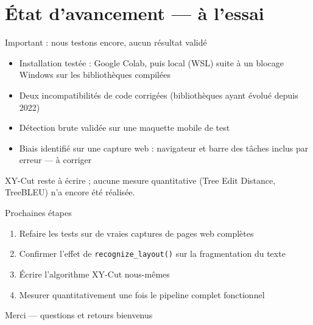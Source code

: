 \documentclass[11pt]{beamer}
\begin{document}
\section{État d'avancement --- à l'essai}

\begin{frame}{\alert{Important} : nous testons encore, aucun résultat validé}
  \begin{itemize}
    \item Installation testée : Google Colab, puis local (WSL) suite à un
      blocage Windows sur les bibliothèques compilées
    \item Deux incompatibilités de code corrigées (bibliothèques ayant évolué
      depuis 2022)
    \item Détection brute validée sur une maquette mobile de test
    \item Biais identifié sur une capture web : navigateur et barre des tâches
      inclus par erreur --- à corriger
  \end{itemize}

  \vspace{1em}
  \alert{XY-Cut reste à écrire ; aucune mesure quantitative (Tree Edit Distance,
  TreeBLEU) n'a encore été réalisée.}
\end{frame}

\begin{frame}{Prochaines étapes}
  \begin{enumerate}
    \item Refaire les tests sur de vraies captures de pages web complètes
    \item Confirmer l'effet de \texttt{recognize\_layout()} sur la fragmentation
      du texte
    \item Écrire l'algorithme XY-Cut nous-mêmes
    \item Mesurer quantitativement une fois le pipeline complet fonctionnel
  \end{enumerate}
\end{frame}

\begin{frame}[standout]
  Merci --- questions et retours bienvenus
\end{frame}
\end{document}

